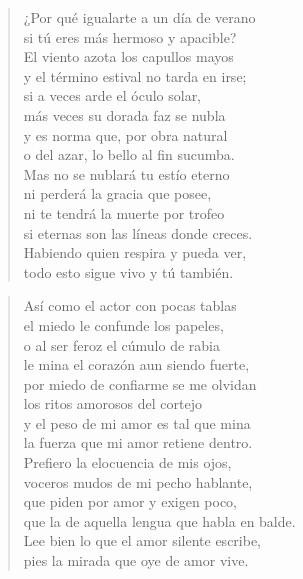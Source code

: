\documentclass[12pt]{article}
\begin{document}
\clearpage
{}
\begin{verse}

¿Por qué igualarte a un día de verano\\
si tú eres más hermoso y apacible?\\
El viento azota los capullos mayos\\
y el término estival no tarda en irse;\\
si a veces arde el óculo solar,\\
más veces su dorada faz se nubla\\
y es norma que, por obra natural\\
o del azar, lo bello al fin sucumba.\\
Mas no se nublará tu estío eterno\\
ni perderá la gracia que posee,\\
ni te tendrá la muerte por trofeo\\
si eternas son las líneas donde creces.\\
Habiendo quien respira y pueda ver,\\
todo esto sigue vivo y tú también.

\end{verse}

\clearpage
{}
\begin{verse}

Así como el actor con pocas tablas\\
el miedo le confunde los papeles,\\
o al ser feroz el cúmulo de rabia\\
le mina el corazón aun siendo fuerte,\\
por miedo de confiarme se me olvidan\\
los ritos amorosos del cortejo\\
y el peso de mi amor es tal que mina\\
la fuerza que mi amor retiene dentro.\\
Prefiero la elocuencia de mis ojos,\\
voceros mudos de mi pecho hablante,\\
que piden por amor y exigen poco,\\
que la de aquella lengua que habla en balde.\\
Lee bien lo que el amor silente escribe,\\
pies la mirada que oye de amor vive.

\end{verse}
\end{document}
